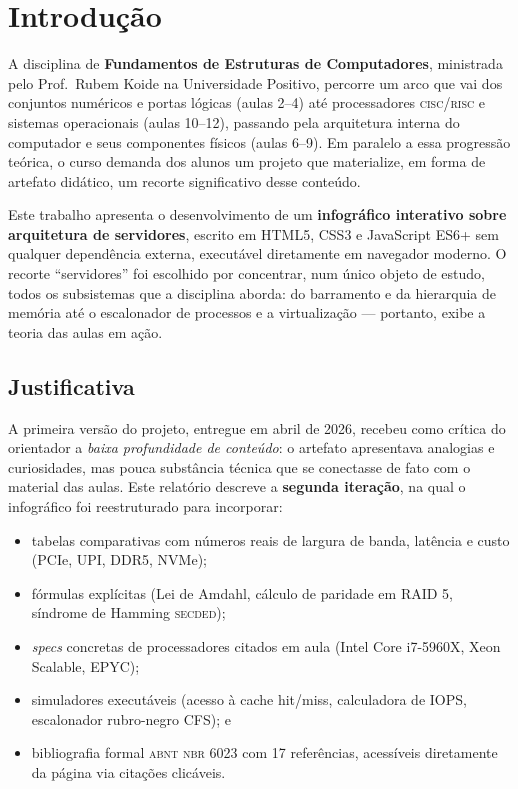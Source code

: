 \chapter{Introdução}
\label{cap:introducao}

A disciplina de \textbf{Fundamentos de Estruturas de Computadores}, ministrada pelo
Prof.\ Rubem Koide na Universidade Positivo, percorre um arco que vai dos
conjuntos numéricos e portas lógicas (aulas 2--4) até processadores
\textsc{cisc}/\textsc{risc} e sistemas operacionais (aulas 10--12),
passando pela arquitetura interna do computador e seus componentes
físicos (aulas 6--9). Em paralelo a essa progressão teórica, o curso
demanda dos alunos um projeto que materialize, em forma de artefato
didático, um recorte significativo desse conteúdo.

Este trabalho apresenta o desenvolvimento de um
\textbf{infográfico interativo sobre arquitetura de servidores},
escrito em \textsf{HTML5}, \textsf{CSS3} e \textsf{JavaScript ES6+}
sem qualquer dependência externa, executável diretamente em navegador
moderno. O recorte ``servidores'' foi escolhido por concentrar, num
único objeto de estudo, todos os subsistemas que a disciplina aborda:
do barramento e da hierarquia de memória até o escalonador de processos
e a virtualização --- portanto, exibe a teoria das aulas em ação.

\section{Justificativa}

A primeira versão do projeto, entregue em abril de 2026, recebeu como
crítica do orientador a \textit{baixa profundidade de conteúdo}: o
artefato apresentava analogias e curiosidades, mas pouca substância
técnica que se conectasse de fato com o material das aulas. Este
relatório descreve a \textbf{segunda iteração}, na qual o infográfico
foi reestruturado para incorporar:

\begin{itemize}
    \item tabelas comparativas com números reais de largura de banda,
          latência e custo (PCIe, UPI, DDR5, NVMe);
    \item fórmulas explícitas (Lei de Amdahl, cálculo de paridade
          em RAID 5, síndrome de Hamming \textsc{secded});
    \item \textit{specs} concretas de processadores citados em
          aula (Intel Core i7-5960X, Xeon Scalable, EPYC);
    \item simuladores executáveis (acesso à cache hit/miss,
          calculadora de IOPS, escalonador rubro-negro CFS); e
    \item bibliografia formal \textsc{abnt} \textsc{nbr 6023}
          com 17 referências, acessíveis diretamente da página
          via citações clicáveis.
\end{itemize}

